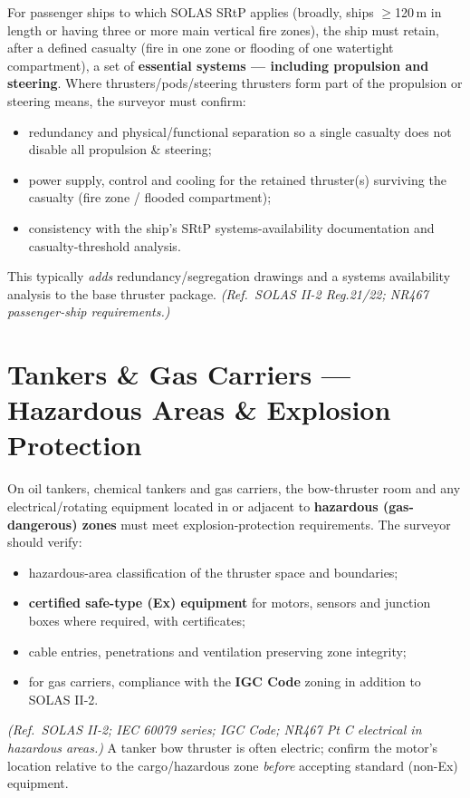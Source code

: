 \documentclass[11pt,a4paper]{report}
\begin{document}
For passenger ships to which SOLAS SRtP applies (broadly, ships $\geq$120\,m in
length or having three or more main vertical fire zones), the ship must retain,
after a defined casualty (fire in one zone or flooding of one watertight
compartment), a set of \textbf{essential systems --- including propulsion and
steering}. Where thrusters/pods/steering thrusters form part of the propulsion
or steering means, the surveyor must confirm:
\begin{itemize}[leftmargin=*]
\item redundancy and physical/functional separation so a single casualty does
not disable all propulsion \& steering;
\item power supply, control and cooling for the retained thruster(s) surviving
the casualty (fire zone / flooded compartment);
\item consistency with the ship's SRtP systems-availability documentation and
casualty-threshold analysis.
\end{itemize}
This typically \emph{adds} redundancy/segregation drawings and a systems
availability analysis to the base thruster package. \textit{(Ref.\ SOLAS II-2
Reg.21/22; NR467 passenger-ship requirements.)}

\section{Tankers \& Gas Carriers --- Hazardous Areas \& Explosion Protection}

On oil tankers, chemical tankers and gas carriers, the bow-thruster room and any
electrical/rotating equipment located in or adjacent to \textbf{hazardous
(gas-dangerous) zones} must meet explosion-protection requirements. The surveyor
should verify:
\begin{itemize}[leftmargin=*]
\item hazardous-area classification of the thruster space and boundaries;
\item \textbf{certified safe-type (Ex) equipment} for motors, sensors and
junction boxes where required, with certificates;
\item cable entries, penetrations and ventilation preserving zone integrity;
\item for gas carriers, compliance with the \textbf{IGC Code} zoning in addition
to SOLAS II-2.
\end{itemize}
\textit{(Ref.\ SOLAS II-2; IEC 60079 series; IGC Code; NR467 Pt C electrical in
hazardous areas.)} A tanker bow thruster is often electric; confirm the motor's
location relative to the cargo/hazardous zone \emph{before} accepting standard
(non-Ex) equipment.
\end{document}
